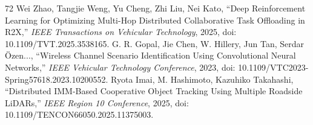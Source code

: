 \documentclass[journal]{IEEEtran}
\begin{document}
\begin{thebibliography}{72}
Wei Zhao, Tangjie Weng, Yu Cheng, Zhi Liu, Nei Kato, ``Deep Reinforcement Learning for Optimizing Multi-Hop Distributed Collaborative Task Offloading in R2X,'' \textit{IEEE Transactions on Vehicular Technology}, 2025, doi: 10.1109/TVT.2025.3538165.
G. R. Gopal, Jie Chen, W. Hillery, Jun Tan, Serdar Özen..., ``Wireless Channel Scenario Identification Using Convolutional Neural Networks,'' \textit{IEEE Vehicular Technology Conference}, 2023, doi: 10.1109/VTC2023-Spring57618.2023.10200552.
Ryota Imai, M. Hashimoto, Kazuhiko Takahashi, ``Distributed IMM-Based Cooperative Object Tracking Using Multiple Roadside LiDARs,'' \textit{IEEE Region 10 Conference}, 2025, doi: 10.1109/TENCON66050.2025.11375003.

\end{thebibliography}
\end{document}
